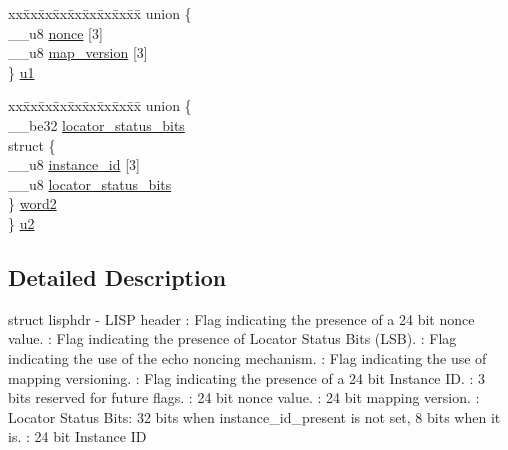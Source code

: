 \begin{DoxyCompactItemize}
\begin{tabbing}
\end{tabbing}\item 
\begin{tabbing}
xx\=xx\=xx\=xx\=xx\=xx\=xx\=xx\=xx\=\kill
union \{\\
\>\_\_u8 \hyperlink{structlisphdr_a02abd6cb7120a0217123dd14841b2d68}{nonce} \mbox{[}3\mbox{]}\\
\>\_\_u8 \hyperlink{structlisphdr_a1852af6ae00c14ed3e4509ebef75f312}{map\_version} \mbox{[}3\mbox{]}\\
\} \hyperlink{structlisphdr_adccf146f1ec7a268b42afe7a266305de}{u1}\\

\end{tabbing}\item 
\begin{tabbing}
xx\=xx\=xx\=xx\=xx\=xx\=xx\=xx\=xx\=\kill
union \{\\
\>\_\_be32 \hyperlink{structlisphdr_a00ce4f1450100ac73fd8713835629db0}{locator\_status\_bits}\\
\>struct \{\\
\>\>\_\_u8 \hyperlink{structlisphdr_a486cbcb938afeadef534fa292fc90dd3}{instance\_id} \mbox{[}3\mbox{]}\\
\>\>\_\_u8 \hyperlink{structlisphdr_af9e8db4b8f0229a4edb6fc632fc896cd}{locator\_status\_bits}\\
\>\} \hyperlink{structlisphdr_a5d95c036f590f2cb6dae970e5b2eba15}{word2}\\
\} \hyperlink{structlisphdr_a3a4210c87d655670bb0c7794223a4616}{u2}\\

\end{tabbing}\end{DoxyCompactItemize}


\subsection{Detailed Description}
struct lisphdr -\/ L\+I\+S\+P header \+: Flag indicating the presence of a 24 bit nonce value. \+: Flag indicating the presence of Locator Status Bits (L\+S\+B). \+: Flag indicating the use of the echo noncing mechanism. \+: Flag indicating the use of mapping versioning. \+: Flag indicating the presence of a 24 bit Instance I\+D. \+: 3 bits reserved for future flags. \+: 24 bit nonce value. \+: 24 bit mapping version. \+: Locator Status Bits\+: 32 bits when instance\+\_\+id\+\_\+present is not set, 8 bits when it is. \+: 24 bit Instance I\+D 

